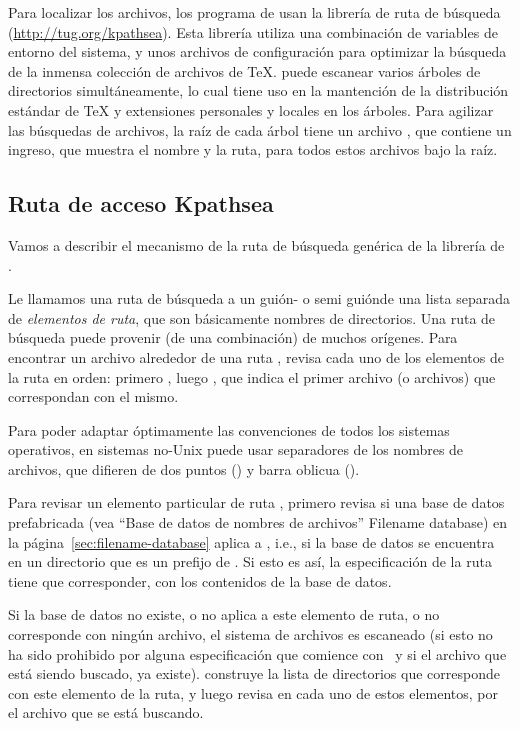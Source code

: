 \documentclass{article}
\begin{document}
Para localizar los archivos, los programa de \Webc{} usan la
librería de ruta de búsqueda \KPS{}
(\url{http://tug.org/kpathsea}). Esta librería utiliza una
combinación de variables de entorno del sistema, y unos
archivos de configuración para optimizar la búsqueda de la inmensa
colección de archivos de \TeX{}. \Webc{} puede escanear varios
árboles de directorios simultáneamente, lo cual tiene uso en
la mantención de la distribución estándar de \TeX{} y
extensiones personales y locales en los árboles. Para agilizar
las búsquedas de archivos, la raíz de cada árbol tiene un
archivo , que contiene un ingreso, que muestra el
nombre y la ruta, para todos estos archivos bajo la raíz. 

\subsection{Ruta de acceso Kpathsea}
\label{sec:kpathsea}

Vamos a describir el mecanismo de la ruta de búsqueda genérica
de la librería de \KPS{}.

Le llamamos una ruta de búsqueda a un guión- o semi guión\hyph de una
lista separada de \emph{elementos de ruta}, que son
básicamente nombres de directorios. Una ruta de búsqueda puede
provenir (de una combinación) de muchos orígenes. Para
encontrar un archivo  alrededor de una ruta
, \KPS{} revisa cada uno de los elementos de la
ruta en orden: primero , luego
, que indica el primer archivo (o
archivos) que correspondan con el mismo. 

Para poder adaptar óptimamente las convenciones de todos los
sistemas operativos, en sistemas no-Unix \KPS{} puede usar
separadores de los nombres de archivos, que difieren de dos puntos
(\samp{:}) y barra oblicua (\samp{/}). 

Para revisar un elemento particular de ruta , \KPS{}
primero revisa si una base de datos prefabricada (vea
``Base de datos de nombres de archivos'' Filename data\-base) en la
página~\ref{sec:filename-database} aplica a , i.e., si
la base de datos se encuentra en un directorio que es un
prefijo de . Si esto es así, la especificación de la
ruta tiene que corresponder, con los contenidos de la base de
datos. 

Si la base de datos no existe, o no aplica a este elemento de
ruta, o no corresponde con ningún archivo, el sistema de
archivos es escaneado (si esto no ha sido prohibido por alguna
especificación que comience con \samp{!!}\ y si el archivo que
está siendo buscado, ya existe). \KPS{} construye la
lista de directorios que corresponde con este elemento de la
ruta, y luego revisa en cada uno de estos elementos, por el
archivo que se está buscando. 
\end{document}
